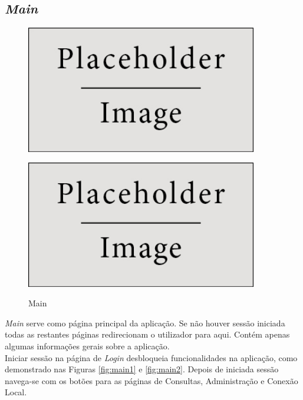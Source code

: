 \documentclass[11pt,twoside,a4paper]{report}
\begin{document}
\subsection{\textit{Main}}
\begin{figure}[H]
\centering
	\begin{minipage}{.5\textwidth}
		\begin{center}
			\includegraphics[width=0.9\textwidth]{placeholder} %
			\label{fig:main1}
		\end{center}
	\end{minipage}%
	\begin{minipage}{.5\textwidth}
		\begin{center}
			\includegraphics[width=0.9\textwidth]{placeholder} %
			\label{fig:main2}
		\end{center}
	\end{minipage}
	\caption{Main}
	\label{fig:main0}
\end{figure}
\textit{Main} serve como página principal da aplicação. Se não houver sessão iniciada todas as restantes páginas redirecionam o utilizador para aqui. Contém apenas algumas informações gerais sobre a aplicação.\\
Iniciar sessão na página de \textit{Login} desbloqueia funcionalidades na aplicação, como demonstrado nas Figuras \ref{fig:main1} e \ref{fig:main2}. Depois de iniciada sessão navega-se com os botões para as páginas de Consultas, Administração e Conexão Local.
\end{document}
